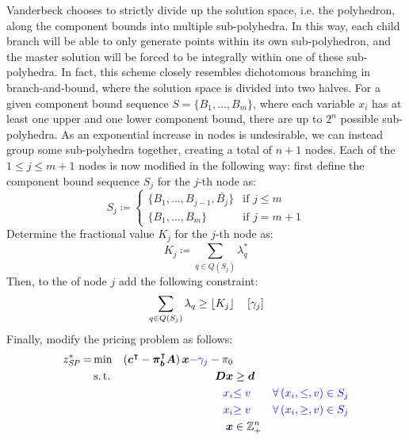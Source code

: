 Vanderbeck chooses to strictly divide up the solution space, i.e. the polyhedron, along the component bounds into multiple sub-polyhedra. In this way, each child branch will be able to only generate points within its own sub-polyhedron, and the master solution will be forced to be integrally within one of these sub-polyhedra. In fact, this scheme closely resembles dichotomous branching in branch-and-bound, where the solution space is divided into two halves. For a given component bound sequence $S = \{B_1, \dots, B_m\}$, where each variable $x_i$ has at least one upper and one lower component bound, there are up to $2^n$ possible sub-polyhedra. As an exponential increase in nodes is undesirable, we can instead group some sub-polyhedra together, creating a total of $n + 1$ nodes. Each of the $1 \leq j \leq m+1$ nodes is now modified in the following way: first define the component bound sequence $S_j$ for the $j$-th node as:
\begin{equation}
S_j \coloneqq
\begin{cases}
\{B_1, \dots, B_{j-1}, \bar{B_j}\} & \text{if } j \leq m \\
\{B_1, \dots, B_m\} & \text{if } j = m+1
\end{cases}
\end{equation}
Determine the fractional value $K_j$ for the $j$-th node as:
\begin{equation}
K_j \coloneqq \sum_{q \in Q(S_j)} \lambda_q^*
\end{equation}
Then, to the \RMP{} of node $j$ add the following constraint:
\begin{equation}
\sum_{q \in Q(S_j)} \lambda_q \geq \lfloor K_j\rfloor \quad \left[\gamma_j\right]
\end{equation}
Finally, modify the pricing problem as follows:
\begin{equation}
\begin{aligned}
z^*_\SP{} = &\min & \left( \vec{c}\transpose - \vec{\pi}_\vec{b}\transpose \mat{A} \right) \vec{x} {\color{blue} - \gamma_j} - \pi_0 & \\
&\st & \mat{D} \vec{x} & \geq \vec{d} \\
&& {\color{blue} x_i} & {\color{blue} \leq v} & {\color{blue} \forall \left( x_i, \leq, v \right) \in S_j} \\
&& {\color{blue} x_i} & {\color{blue} \geq v} & {\color{blue} \forall \left( x_i, \geq, v \right) \in S_j} \\
&& \vec{x} & \in \mathbb{Z}_+^n
\end{aligned}
\end{equation}


